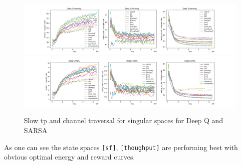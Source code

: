 \begin{figure}[H]
\centering
\hspace*{-3.3cm}  
\includegraphics[scale=0.40]{plots/slow_action/deep_q_slow_action_singular_state_space_small.png}\\
\hspace*{-3.3cm} 
\includegraphics[scale=0.40]{plots/slow_action/slow_action_singular_deep_sarsa.png}
  \caption{Slow tp and channel traversal for singular spaces for Deep Q and SARSA}
\end{figure}

As one can see the state spaces \texttt{[sf]}, \texttt{[thoughput]} 
are performing best with obvious optimal energy and reward curves.






